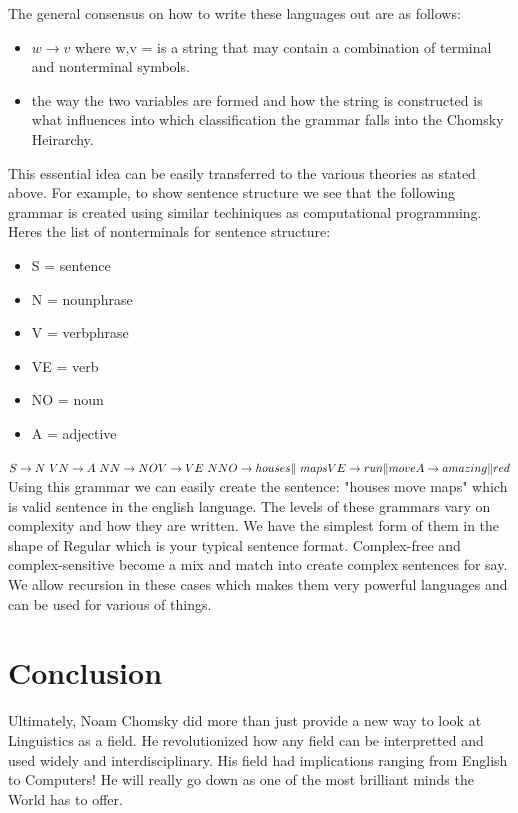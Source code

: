\documentclass[conference]{IEEEtran}
\begin{document}
The general consensus on how to write these languages out are as follows:
\begin{itemize}
\item $w \rightarrow v$ where w,v = is a string that may contain a combination of terminal and nonterminal symbols. 
\item the way the two variables are formed and how the string is constructed is what influences into which classification the grammar falls into the Chomsky Heirarchy. 
\end{itemize}
This essential idea can be easily transferred to the various theories as stated above. For example, to show sentence structure we see that the following grammar is created using similar techiniques as computational programming.
Heres the list of nonterminals for sentence structure: 
\begin{itemize}
\item S = sentence 
\item N = nounphrase
\item V = verbphrase
\item VE = verb 
\item NO = noun
\item A = adjective
\end{itemize}
$S \rightarrow N \ V \newline 
N \rightarrow A \ N \newline 
N \rightarrow NO \newline
V \rightarrow VE \ N \newline
NO \rightarrow houses \| \ maps \newline 
VE \rightarrow run \| move \newline 
A \rightarrow amazing \| red $\newline 
Using this grammar we can easily create the sentence: "houses move maps" which is valid sentence in the english language. The levels of these grammars vary on complexity and how they are written. We have the simplest form of them in the shape of Regular which is your typical sentence format. Complex-free and complex-sensitive become a mix and match into create complex sentences for say. We allow recursion in these cases which makes them very powerful languages and can be used for various of things. 
\section{Conclusion}
Ultimately, Noam Chomsky did more than just provide a new way to look at Linguistics as a field. He revolutionized how any field can be interpretted and used widely and interdisciplinary. His field had implications ranging from English to Computers! He will really go down as one of the most brilliant minds the World has to offer. 
\end{document}
